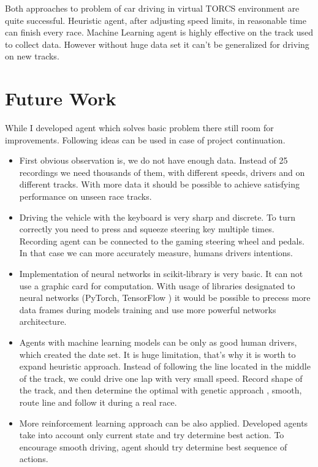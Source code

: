 \documentclass[declaration,shortabstract,english,inz]{iithesis}
\begin{document}
Both approaches to problem of car driving in virtual TORCS environment are quite successful.
Heuristic agent, after adjusting speed limits, in reasonable time can finish every race.
Machine Learning agent is highly effective on the track used to collect data.
However without huge data set it can't be generalized for driving on new tracks.


\section{Future Work}

While I developed agent which solves basic problem there still room for improvements.
Following ideas can be used in case of project continuation.
\begin{itemize}
    \item First obvious observation is, we do not have enough data.
Instead of 25 recordings we need thousands of them, with different speeds, drivers and on different tracks.
With more data it should be possible to achieve satisfying performance on unseen race tracks.

    \item Driving the vehicle with the keyboard is very sharp and discrete.
To turn correctly you need to press and squeeze steering key multiple times.
Recording agent can be connected to the gaming steering wheel and pedals.
In that case we can more accurately measure, humans drivers intentions.

    \item Implementation of neural networks in scikit-library is very basic.
It can not use a graphic card for computation.
With usage of libraries designated to neural networks (PyTorch, TensorFlow \cite{tensor_flow}) it would be possible to precess more data frames during models training and use more  powerful networks architecture.
    \item Agents with machine learning models  can be only as good human drivers, which created the date set.
It is huge limitation, that's why it is worth to expand heuristic approach.
Instead of following the line located in the middle of the track, we could drive one lap with very small speed.
Record shape of the track, and then determine the optimal with genetic approach \cite{genetic-optimal-race-line}, smooth, route line and follow it during a real race.

    \item More reinforcement learning approach can be also applied.
Developed agents take into account only current state and try determine best action.
To encourage smooth driving, agent should try determine best sequence of actions.


\end{itemize}
\end{document}
